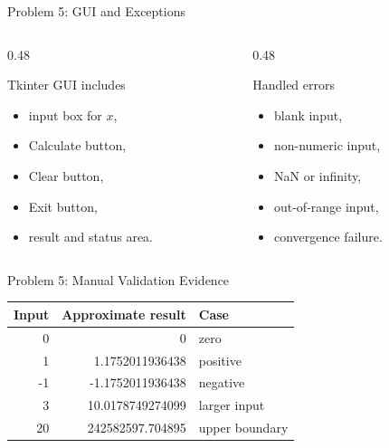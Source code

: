 \documentclass[aspectratio=169,11pt]{beamer}
\begin{document}
\begin{frame}{Problem 5: GUI and Exceptions}
\begin{columns}[T]
\begin{column}{0.48\textwidth}
\begin{block}{Tkinter GUI includes}
\begin{itemize}
    \item input box for $x$,
    \item Calculate button,
    \item Clear button,
    \item Exit button,
    \item result and status area.
\end{itemize}
\end{block}
\end{column}
\begin{column}{0.48\textwidth}
\begin{block}{Handled errors}
\begin{itemize}
    \item blank input,
    \item non-numeric input,
    \item NaN or infinity,
    \item out-of-range input,
    \item convergence failure.
\end{itemize}
\end{block}
\end{column}
\end{columns}
\end{frame}

\begin{frame}{Problem 5: Manual Validation Evidence}
\centering
\begin{tabular}{r r l}
\toprule
\textbf{Input} & \textbf{Approximate result} & \textbf{Case} \\
\midrule
0 & 0 & zero \\
1 & 1.1752011936438 & positive \\
-1 & -1.1752011936438 & negative \\
3 & 10.0178749274099 & larger input \\
20 & 242582597.704895 & upper boundary \\
\bottomrule
\end{tabular}
\end{frame}
\end{document}
